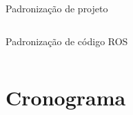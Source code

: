 \documentclass{if-beamer}
\begin{document}
\begin{frame}{Padronização de projeto}
\begin{columns}
\begin{column}{0.55\textwidth}
\begin{block}{Padronização de código ROS}
\begin{itemize}
				\end{itemize}
				
			\end{block}
			
		\end{column}
		
	\end{columns}
	
	\pause

	\vspace{5mm}

	
\end{frame}


\section{Cronograma}
\end{document}
